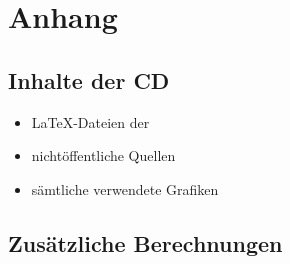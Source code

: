 \chapter{Anhang}
\label{Anhang}

\section{Inhalte der CD}
\label{CD}
    \begin{itemize}
        \item \LaTeX-Dateien der \art
        \item nichtöffentliche Quellen
        \item sämtliche verwendete Grafiken
    \end{itemize}

    \section{Zusätzliche Berechnungen}

